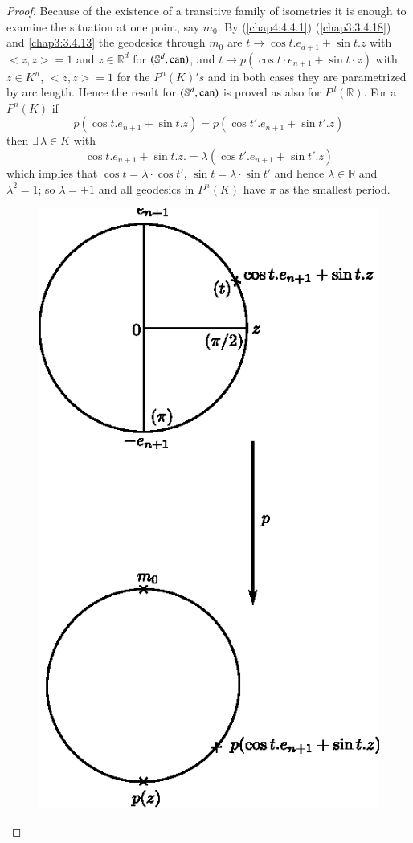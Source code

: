 \begin{proof}
Because of the existence of a transitive family of isometries it is
enough to examine the situation at one point, say $m_{0}$. By
(\ref{chap4:4.4.1}) (\ref{chap3:3.4.18}) and \eqref{chap3:3.4.13} the geodesics
through $m_{0}$ are $t\to \cos t.e_{d+1}+\sin t.z$ with $<z,z>=1$ and
$z\in \mathbb{R}^{d}$ for $(\mathbb{S}^{d},\operatorname{can})$, and $t\to p(\cos
t\cdot e_{n+1}+\sin t\cdot z)$ with $z\in K^{n}$, $<z,z>=1$ for the
$P^{n}(K)'s$ and in both cases they are parametrized by arc
length. Hence the result for $(\mathbb{S}^{d},\operatorname{can})$ is proved as also
for $P^{d}(\mathbb{R})$. For a $P^{n}(K)$ if
$$
p(\cos t.e_{n+1}+\sin t.z)=p(\cos t'.e_{n+1}+\sin t'.z)
$$
then $\exists\,\lambda\in K$ with
$$
\cos t.e_{n+1}+\sin t.z.=\lambda(\cos t'.e_{n+1}+\sin t'.z)
$$
which implies that $\cos t=\lambda\cdot \cos t'$, $\sin t=\lambda\cdot
\sin t'$ and hence $\lambda\in\mathbb{R}$ and $\lambda^{2}=1$; so
$\lambda=\pm 1$ and all geodesics in $P^{n}(K)$ have $\pi$
as \pageoriginale the smallest period.
\begin{figure}[H]
\centering
\includegraphics{chap4-fig1.eps}
\end{figure}
\end{proof}

